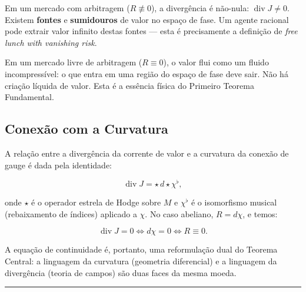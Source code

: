 \noindent Em um mercado com arbitragem ($R \not\equiv 0$), a diverg\^encia \'e n\~ao-nula: $\operatorname{div} J \neq 0$. Existem \textbf{fontes} e \textbf{sumidouros} de valor no espa\c{c}o de fase. Um agente racional pode extrair valor infinito destas fontes --- esta \'e precisamente a defini\c{c}\~ao de \textit{free lunch with vanishing risk}.

Em um mercado livre de arbitragem ($R \equiv 0$), o valor flui como um fluido incompress\'ivel: o que entra em uma regi\~ao do espa\c{c}o de fase deve sair. N\~ao h\'a cria\c{c}\~ao l\'iquida de valor. Esta \'e a ess\^encia f\'isica do Primeiro Teorema Fundamental.

\subsection{Conex\~ao com a Curvatura}

A rela\c{c}\~ao entre a diverg\^encia da corrente de valor e a curvatura da conex\~ao de gauge \'e dada pela identidade:

\begin{equation}
\operatorname{div} J = \star\, d \star \chi^\flat,
\end{equation}

onde $\star$ \'e o operador estrela de Hodge sobre $M$ e $\chi^\flat$ \'e o isomorfismo musical (rebaixamento de \'indices) aplicado a $\chi$. No caso abeliano, $R = d\chi$, e temos:

\begin{equation}
\operatorname{div} J = 0 \Longleftrightarrow d\chi = 0 \Longleftrightarrow R \equiv 0.
\end{equation}

\noindent A equa\c{c}\~ao de continuidade \'e, portanto, uma reformula\c{c}\~ao dual do Teorema Central: a linguagem da curvatura (geometria diferencial) e a linguagem da diverg\^encia (teoria de campos) s\~ao duas faces da mesma moeda.

\vspace{1em}
\noindent\rule{\textwidth}{0.5pt}
\vspace{0.5em}

